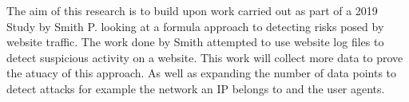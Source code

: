 The aim of this research is to build upon work carried out as part of a 2019 Study by Smith P. looking at a  formula approach to detecting risks posed by website traffic. The work done by Smith attempted to use website log files to detect suspicious activity on a website. This work will collect more data to prove the atuacy of this approach. As well as expanding the number of data points to detect attacks for example the network an IP belongs to and the user agents.  